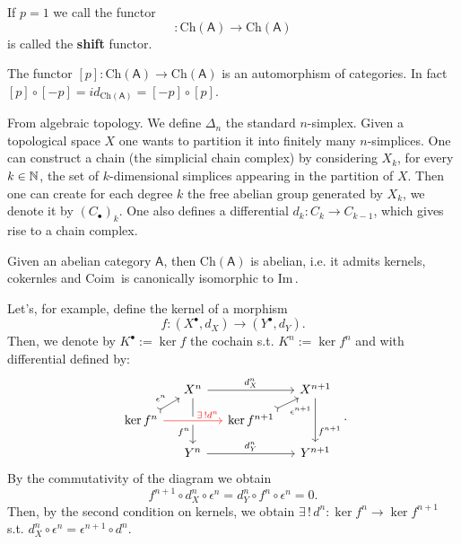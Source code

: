 \begin{rem}
	If $p = 1$ we call the functor
	\begin{equation}
		[1]: \mathrm{Ch}(\mathsf{A}) \to \mathrm{Ch}(\mathsf{A})
	\end{equation} 
	is called the \textbf{shift} functor.
\end{rem}

\begin{rem}[]
	The functor $[p]: \mathrm{Ch}(\mathsf{A}) \to \mathrm{Ch}(\mathsf{A})$ is an automorphism of categories.
	In fact $[p] \circ [-p] = id_{\mathrm{Ch}(\mathsf{A})} = [-p] \circ [p]$.	
\end{rem}

\begin{rem}
	From algebraic topology.
	We define $\Delta_n$ the standard $n$-simplex.
	Given a topological space $X$ one wants to partition it into finitely many
	$n$-simplices.
	One can construct a chain (the simplicial chain complex) by considering $X_k$, for every $k \in \mathbb{N}$,
	the set of $k$-dimensional simplices appearing in the partition of $X$.
	Then one can create for each degree $k$ the free abelian group generated by $X_k$, we denote it by $(C_{\bullet})_k$.
	One also defines a differential $d_k: C_k \to C_{k-1}$, which gives rise to a chain complex.
\end{rem}

\begin{prop}
	Given an abelian category $\mathsf{A}$, then $\mathrm{Ch}(\mathsf{A})$ is abelian,
	i.e. it admits kernels, cokernles and $\mathrm{Coim}\, $ is canonically isomorphic to $\mathrm{Im}\, $.
\end{prop}

\begin{ex}
	Let's, for example, define the kernel of a morphism
	\begin{equation}
	f: \left( X^{\bullet}, d_{X} \right) \to \left( Y^{\bullet}, d_{Y} \right)
	.\end{equation} 
	Then, we denote by $K^{\bullet} := \ker f$ the cochain s.t. $K^n := \ker f^n$
	and with differential defined by:
	\begin{equation}
		\begin{tikzcd}[column sep=small, row sep=small]
		& X^n \arrow[rr, "d^n_X", rightarrow] \arrow[dd, "f^n"' near end, rightarrow] & &
		X^{n+1} \arrow[dd, "f^{n+1}" near end, rightarrow] \\
		\ker f^n \arrow[ru, "\epsilon^n", tail]
			\arrow[rr, "\exists\, ! d^n" near end, rightarrow, red, crossing over] & &
		\ker f^{n+1} \arrow[ru, "\epsilon^{n+1}"', tail] \\
		& Y^n \arrow[rr, "d^n_Y", rightarrow] & &
		Y^{n+1}
	\end{tikzcd}
	.\end{equation} 
	By the commutativity of the diagram we obtain
	\begin{equation}
	f^{n+1} \circ d^n_X \circ \epsilon^n = 
	d_Y^n \circ f^n \circ \epsilon^n = 0
	.\end{equation} 
	Then, by the second condition on kernels, we obtain $\exists\, !\, d^n: \ker f^n \to \ker f^{n+1}$ s.t.
	$d^n_X \circ \epsilon^n = \epsilon^{n+1} \circ d^n$.
\end{ex} 

